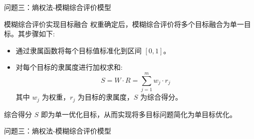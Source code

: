 \documentclass{beamer}
\begin{document}
\begin{frame}{问题三：熵权法-模糊综合评价模型}
    \begin{block}{模糊综合评价实现目标融合}
        权重确定后，模糊综合评价将多个目标融合为单一目标。其步骤如下:
        \begin{itemize}
            \item 通过隶属函数将每个目标值标准化到区间 $[0,1]$。
            \item 对每个目标的隶属度进行加权求和:
            \[
                S = W \cdot R = \sum_{j=1}^m w_j \cdot r_j
            \]
            其中 $w_j$ 为权重，$r_j$ 为目标的隶属度，$S$ 为综合得分。
        \end{itemize}
        综合得分 $S$ 即为单一优化目标，从而实现将多目标问题简化为单目标优化。
    \end{block}
\end{frame}

\begin{frame}{问题三：熵权法-模糊综合评价模型}
    \begin{table}[htbp]
    \centering
    \caption{评价得分情况（部分展示）}
    \label{table:score}
    \end{table}
\end{frame}
\end{document}
